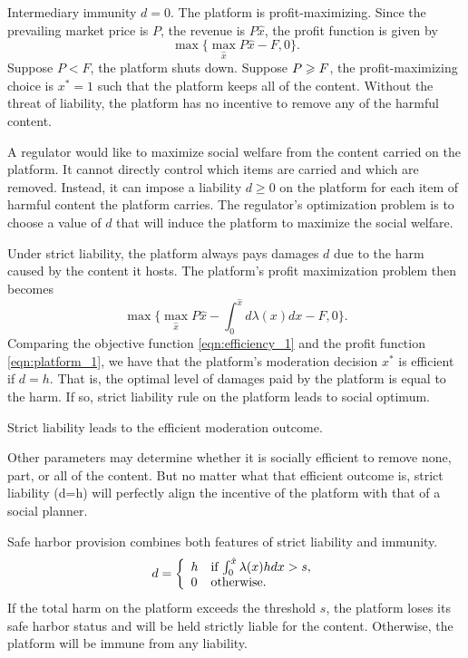 Intermediary immunity $d=0$.
The platform is profit-maximizing. Since the prevailing market price is $P$, the revenue is $P\hat{x}$, the profit function is given by 
\begin{equation}
    \max\{\max_{\hat{x}}P\hat{x}-F,0\}.
\end{equation}
Suppose $P<F$, the platform shuts down. Suppose $P\geqslant F$, the profit-maximizing choice is $x^{\ast}=1$ such that the platform keeps all of the content. Without the threat of liability, the platform has no incentive to remove any of the harmful content. 


A regulator would like to maximize social welfare from the content carried on the platform. It cannot directly control which items are carried and which are removed. Instead, it can impose a liability $d\ge 0$ on the platform for each item of harmful content the platform carries. The regulator's optimization problem is to choose a value of $d$ that will induce the platform to maximize the social welfare.

Under strict liability, the platform always pays damages $d$ due to the harm caused by the content it hosts. 
The platform's profit maximization problem then becomes
\begin{equation}\label{eqn:platform_1}
    \max\{\max_{\hat{x}}P\hat{x} - \int_0^{\hat{x}}d\lambda(x)dx-F, 0\}.
\end{equation}
Comparing the objective function \ref{eqn:efficiency_1} and the profit function \ref{eqn:platform_1}, we have that the platform's moderation decision $x^{\ast}$ is efficient if $d=h$. 
That is, the optimal level of damages paid by the platform is equal to the harm.
If so, strict liability rule on the platform leads to social optimum. 

\begin{proposition}
Strict liability leads to the efficient moderation outcome.
\end{proposition}

Other parameters may determine whether it is socially efficient to remove none, part, or all of the content. But no matter what that efficient outcome is, strict liability (d=h) will perfectly align the incentive of the platform with that of a social planner.

Safe harbor provision combines both features of strict liability and immunity. 
\begin{equation}
d=
\left\{\begin{array}{ll}
    h & \mbox{if $\int_0^{\hat{x}}\lambda(x)hdx>s$}, \\
    0 & \mbox{otherwise}.
\end{array}\right.
\end{equation}
If the total harm on the platform exceeds the threshold $s$, the platform loses its safe harbor status and will be held strictly liable for the content. Otherwise, the platform will be immune from any liability. 


